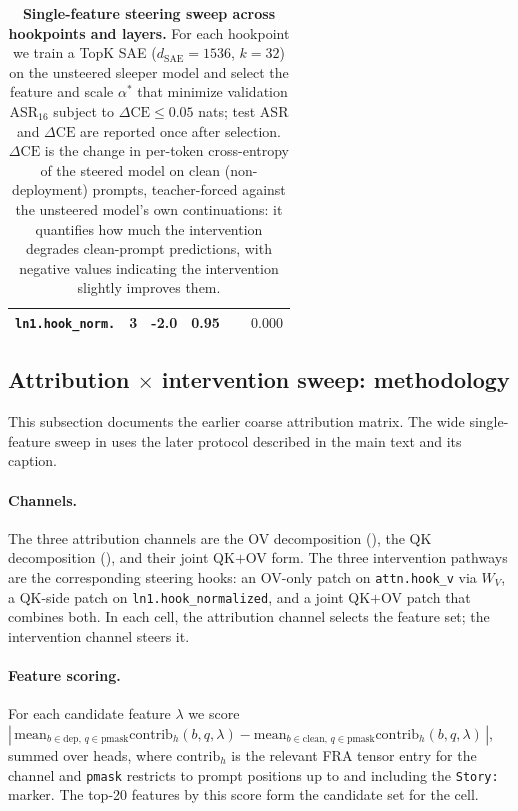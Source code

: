 \documentclass{article} %
\theoremstyle{plain}
\theoremstyle{definition}
\theoremstyle{remark}
\newcommand{\WV}{W_V}
\begin{document}
\begin{table}[t]
\begin{tabular}{llccc}
\texttt{ln1.hook\_norm.} & 3 & -2.0 & 0.95 & $\phantom{+}0.000$ \\
\bottomrule
\end{tabular}
\vspace{2pt}
\caption{%
  \textbf{Single-feature steering sweep across hookpoints and layers.}
  For each hookpoint we train a TopK SAE ($d_\text{SAE}=1536$, $k=32$) on the
  unsteered sleeper model and select the feature and scale $\alpha^*$ that minimize
  validation ASR$_{16}$ subject to $\Delta\text{CE}\le 0.05$ nats; test ASR and
  $\Delta\text{CE}$ are reported once after selection.
  $\Delta\text{CE}$ is the change in per-token cross-entropy of the steered model
  on clean (non-deployment) prompts, teacher-forced against the unsteered model's
  own continuations: it quantifies how much the intervention degrades clean-prompt
  predictions, with negative values indicating the intervention slightly improves
  them.
}
\label{tab:hookpoint_sweep}
\end{table}

\subsection{Attribution $\times$ intervention sweep: methodology}
\label{app:sleeper_method}

This subsection documents the earlier coarse attribution matrix. The wide single-feature sweep in  uses the later protocol described in the main text and its caption.

\paragraph{Channels.} The three attribution channels are the OV decomposition (), the QK decomposition (), and their joint QK${+}$OV form. The three intervention pathways are the corresponding steering hooks: an OV-only patch on \texttt{attn.hook\_v} via $\WV$, a QK-side patch on \texttt{ln1.hook\_normalized}, and a joint QK${+}$OV patch that combines both. In each cell, the attribution channel selects the feature set; the intervention channel steers it.

\paragraph{Feature scoring.} For each candidate feature $\lambda$ we score $|\,\mathrm{mean}_{b \in \text{dep},\, q \in \text{pmask}} \mathrm{contrib}_h(b, q, \lambda) - \mathrm{mean}_{b \in \text{clean},\, q \in \text{pmask}} \mathrm{contrib}_h(b, q, \lambda)\,|$, summed over heads, where $\mathrm{contrib}_h$ is the relevant FRA tensor entry for the channel and \texttt{pmask} restricts to prompt positions up to and including the \texttt{Story:} marker. The top-20 features by this score form the candidate set for the cell.
\end{document}
